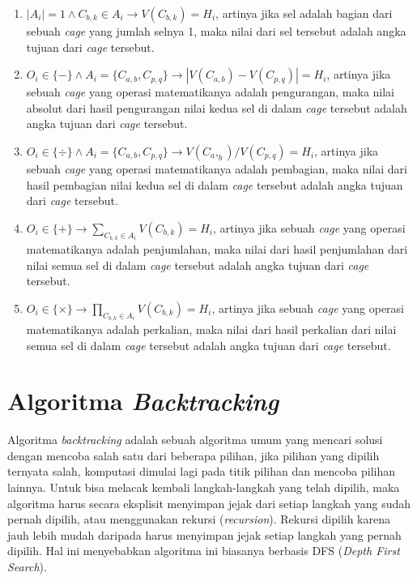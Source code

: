\begin{enumerate}
\item \begin{math}|A_i| = 1 \land C_{b,k} \in A_i \rightarrow V(C_{b,k}) = H_i\end{math}, artinya jika sel adalah bagian dari sebuah \textit{cage} yang jumlah selnya 1, maka nilai dari sel tersebut adalah angka tujuan dari \textit{cage} tersebut.
\item \begin{math}O_i \in \{-\} \land A_i = \{C_{a,b}, C_{p,q}\} \rightarrow |V(C_{a,b}) - V(C_{p,q})| = H_i\end{math}, artinya jika sebuah \textit{cage} yang operasi matematikanya adalah pengurangan, maka nilai absolut dari hasil pengurangan nilai kedua sel di dalam \textit{cage} tersebut adalah angka tujuan dari \textit{cage} tersebut.
\item \begin{math}O_i \in \{\div\} \land A_i = \{C_{a,b}, C_{p,q}\} \rightarrow V(C_a,_b) / V(C_{p,q}) = H_i\end{math}, artinya jika sebuah \textit{cage} yang operasi matematikanya adalah pembagian, maka nilai dari hasil pembagian nilai kedua sel di dalam \textit{cage} tersebut adalah angka tujuan dari \textit{cage} tersebut.
\item \begin{math}O_i \in \{+\} \rightarrow \sum_{C_{b,k} \in A_i} V(C_{b,k}) = H_i\end{math}, artinya jika sebuah \textit{cage} yang operasi matematikanya adalah penjumlahan, maka nilai dari hasil penjumlahan dari nilai semua sel di dalam \textit{cage} tersebut adalah angka tujuan dari \textit{cage} tersebut.
\item \begin{math}O_i \in \{\times\} \rightarrow \prod_{C_{b,k} \in A_i} V(C_{b,k}) = H_i\end{math}, artinya jika sebuah \textit{cage} yang operasi matematikanya adalah perkalian, maka nilai dari hasil perkalian dari nilai semua sel di dalam \textit{cage} tersebut adalah angka tujuan dari \textit{cage} tersebut.
\end{enumerate}

\section{Algoritma \textit{Backtracking} ~\cite{fahda:16:backtracking}}
\label{sec:backtracking}

Algoritma \textit{backtracking} adalah sebuah algoritma umum yang mencari solusi dengan mencoba salah satu dari beberapa pilihan, jika pilihan yang dipilih ternyata salah, komputasi dimulai lagi pada titik pilihan dan mencoba pilihan lainnya. Untuk bisa melacak kembali langkah-langkah yang telah dipilih, maka algoritma harus secara eksplisit menyimpan jejak dari setiap langkah yang sudah pernah dipilih, atau menggunakan rekursi (\textit{recursion}). Rekursi dipilih karena jauh lebih mudah daripada harus menyimpan jejak setiap langkah yang pernah dipilih. Hal ini menyebabkan algoritma ini biasanya berbasis DFS (\textit{Depth First Search}).

